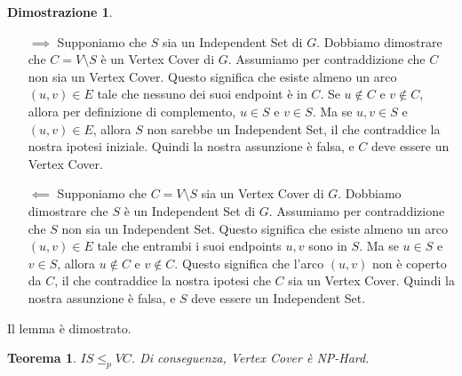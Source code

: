 \documentclass[a4paper, 11pt]{book} %
\newtheorem{theorem}{Teorema}[section]
\theoremstyle{definition}
\newtheorem*{proof*}{Dimostrazione}
\begin{document}
\begin{proof*}
\begin{itemize}
    \item[$\implies$] Supponiamo che $S$ sia un Independent Set di $G$.
    Dobbiamo dimostrare che $C = V \setminus S$ è un Vertex Cover di $G$.
    Assumiamo per contraddizione che $C$ non sia un Vertex Cover. Questo significa che esiste almeno un arco $(u, v) \in E$ tale che nessuno dei suoi endpoint è in $C$. Se $u \notin C$ e $v \notin C$, allora per definizione di complemento, $u \in S$ e $v \in S$. Ma se $u, v \in S$ e $(u, v) \in E$, allora $S$ non sarebbe un Independent Set, il che contraddice la nostra ipotesi iniziale. Quindi la nostra assunzione è falsa, e $C$ deve essere un Vertex Cover.

    \item[$\impliedby$] Supponiamo che $C = V \setminus S$ sia un Vertex Cover di $G$.
    Dobbiamo dimostrare che $S$ è un Independent Set di $G$.
    Assumiamo per contraddizione che $S$ non sia un Independent Set. Questo significa che esiste almeno un arco $(u, v) \in E$ tale che entrambi i suoi endpoints $u, v$ sono in $S$. Ma se $u \in S$ e $v \in S$, allora $u \notin C$ e $v \notin C$. Questo significa che l'arco $(u, v)$ non è coperto da $C$, il che contraddice la nostra ipotesi che $C$ sia un Vertex Cover. Quindi la nostra assunzione è falsa, e $S$ deve essere un Independent Set.
\end{itemize}
Il lemma è dimostrato.
\end{proof*}

\begin{theorem}
$IS \le_p VC$. Di conseguenza, \emph{Vertex Cover} è NP-Hard.
\end{theorem}
\end{document}
